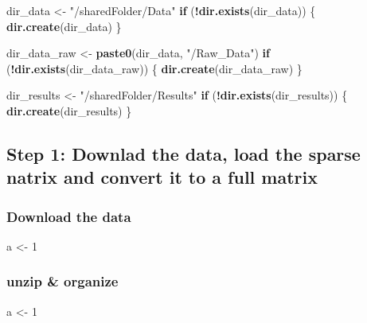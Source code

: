 \documentclass[]{article}
\newenvironment{Shaded}{\begin{snugshade}}{\end{snugshade}}
\newcommand{\ControlFlowTok}[1]{\textcolor[rgb]{0.13,0.29,0.53}{\textbf{#1}}}
\newcommand{\DecValTok}[1]{\textcolor[rgb]{0.00,0.00,0.81}{#1}}
\newcommand{\KeywordTok}[1]{\textcolor[rgb]{0.13,0.29,0.53}{\textbf{#1}}}
\newcommand{\NormalTok}[1]{#1}
\newcommand{\OperatorTok}[1]{\textcolor[rgb]{0.81,0.36,0.00}{\textbf{#1}}}
\newcommand{\StringTok}[1]{\textcolor[rgb]{0.31,0.60,0.02}{#1}}
\begin{document}
\begin{Shaded}
\begin{Highlighting}[]
\NormalTok{dir_data <-}\StringTok{ "/sharedFolder/Data"}
\ControlFlowTok{if}\NormalTok{ (}\OperatorTok{!}\KeywordTok{dir.exists}\NormalTok{(dir_data)) \{}
    \KeywordTok{dir.create}\NormalTok{(dir_data)}
\NormalTok{\}}

\NormalTok{dir_data_raw <-}\StringTok{ }\KeywordTok{paste0}\NormalTok{(dir_data, }\StringTok{"/Raw_Data"}\NormalTok{)}
\ControlFlowTok{if}\NormalTok{ (}\OperatorTok{!}\KeywordTok{dir.exists}\NormalTok{(dir_data_raw)) \{}
    \KeywordTok{dir.create}\NormalTok{(dir_data_raw)}
\NormalTok{\}}

\NormalTok{dir_results <-}\StringTok{ "/sharedFolder/Results"}
\ControlFlowTok{if}\NormalTok{ (}\OperatorTok{!}\KeywordTok{dir.exists}\NormalTok{(dir_results)) \{}
    \KeywordTok{dir.create}\NormalTok{(dir_results)}
\NormalTok{\}}
\end{Highlighting}
\end{Shaded}

\hypertarget{step-1-downlad-the-data-load-the-sparse-natrix-and-convert-it-to-a-full-matrix}{%
\subsection{Step 1: Downlad the data, load the sparse natrix and convert
it to a full
matrix}\label{step-1-downlad-the-data-load-the-sparse-natrix-and-convert-it-to-a-full-matrix}}

\hypertarget{download-the-data}{%
\subsubsection{Download the data}\label{download-the-data}}

\begin{Shaded}
\begin{Highlighting}[]
\NormalTok{a <-}\StringTok{ }\DecValTok{1}
\end{Highlighting}
\end{Shaded}

\hypertarget{unzip-organize}{%
\subsubsection{unzip \& organize}\label{unzip-organize}}

\begin{Shaded}
\begin{Highlighting}[]
\NormalTok{a <-}\StringTok{ }\DecValTok{1}
\end{Highlighting}
\end{Shaded}
\end{document}
